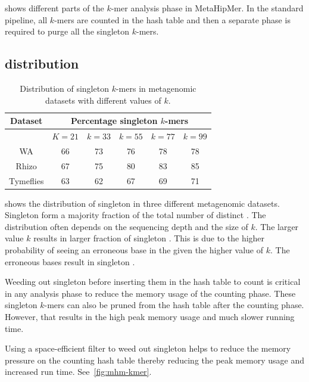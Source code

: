  shows different parts of the $k$-mer analysis phase in
MetaHipMer. In the standard pipeline, all $k$-mers are counted in the hash table
and then a separate phase is required to purge all the singleton $k$-mers.

\subsection{\Kmer distribution}

\begin{table}
\centering
    \begin{tabular}{c | c | c | c | c | c}
    \toprule
    {\bf Dataset} & \multicolumn{5}{c}{\bf Percentage singleton $k$-mers} \\
    \midrule
    & $K=21$ & $k=33$ & $k=55$ & $k=77$ & $k=99$ \\
    \midrule
    WA &  66 & 73 & 76 & 78 & 78  \\
    Rhizo &  67 & 75 & 80 & 83 & 85  \\
    Tymeflies & 63 & 62 & 67 & 69 & 71 \\
    \bottomrule
    \end{tabular}
    \caption{Distribution of singleton $k$-mers in metagenomic datasets with different values of $k$.}
    \label{tab:kmer-dist}
\end{table}

 shows the distribution of singleton \kmers in three
different metagenomic datasets. Singleton \kmers form a majority fraction of
the total number of distinct \kmers. The distribution often depends on the
sequencing depth and the size of $k$. The larger value $k$ results in larger
fraction of singleton \kmers. This is due to the higher probability of seeing
an erroneous base in the \kmer given the higher value of $k$. The erroneous
bases result in singleton \kmers.

Weeding out singleton \kmers before inserting them in the hash table to count
is critical in any \kmer analysis phase to reduce the memory usage of the
counting phase. These singleton $k$-mers can also be pruned from the hash table
after the counting phase. However, that results in the high peak memory usage
and much slower running time.

Using a space-efficient filter to weed out singleton \kmers helps to reduce
the memory pressure on the counting hash table thereby reducing the peak memory
usage and increased run time. See~\cref{fig:mhm-kmer}.



